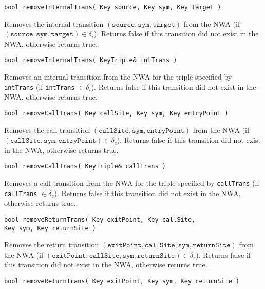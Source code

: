 \begin{description}

  \item\texttt{bool removeInternalTrans( Key source, Key sym, Key target )} \nopagebreak

    Removes the internal transition
    $(\texttt{source},\texttt{sym},\texttt{target})$ from the NWA (if
    $(\texttt{source},\texttt{sym},\texttt{target}) \in \delta_i$).  Returns
    false if this transition did not exist in the NWA, otherwise returns
    true.

  \item\texttt{bool removeInternalTrans( KeyTriple\& intTrans )} \nopagebreak 

    Removes an internal transition from the NWA for the triple specified by
    \texttt{intTrans} (if \texttt{intTrans} $\in \delta_i$).  Returns false
    if this transition did not exist in the NWA, otherwise returns true.

  \item\texttt{bool removeCallTrans( Key callSite, Key sym, Key entryPoint )} \nopagebreak

    Removes the call transition
    $(\texttt{callSite},\texttt{sym},\texttt{entryPoint})$ from the NWA (if
    $(\texttt{callSite},\texttt{sym},\texttt{entryPoint}) \in \delta_c$).
    Returns false if this transition did not exist in the NWA, otherwise
    returns true.
 
  \item\texttt{bool removeCallTrans( KeyTriple\& callTrans )} \nopagebreak

    Removes a call transition from the NWA for the triple specified by
    \texttt{callTrans} (if \texttt{callTrans} $\in \delta_c$).  Returns false
    if this transition did not exist in the NWA, otherwise returns true.

  \item\texttt{bool removeReturnTrans( Key exitPoint, Key
    callSite,\\ \hspace*{3.25cm} Key sym, Key returnSite )} \nopagebreak

    Removes the return transition
    $(\texttt{exitPoint},\texttt{callSite},\texttt{sym},\texttt{returnSite})$
    from the NWA (if
    $(\texttt{exitPoint},\texttt{callSite},\texttt{sym},\texttt{returnSite})
    \in \delta_r$).  Returns false if this transition did not exist in the
    NWA, otherwise returns true.

  \item\texttt{bool removeReturnTrans( Key exitPoint, Key sym, Key returnSite )} \nopagebreak


\end{description}
